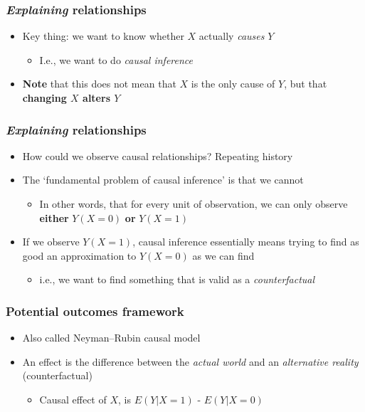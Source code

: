 \documentclass[aspectratio=43]{beamer}
\begin{document}
\begin{frame}
\frametitle{\textit{Explaining} relationships}
\centering

\begin{itemize}
  \item Key thing: we want to know whether $X$ actually \textit{causes} $Y$
  \begin{itemize}
    \item I.e., we want to do \textit{causal inference}
  \end{itemize}
  \item \textbf{Note} that this does not mean that $X$ is the only cause of $Y$, but that \textbf{changing $X$ alters $Y$}
\end{itemize}

\end{frame}

\begin{frame}
\frametitle{\textit{Explaining} relationships}
\centering

\begin{itemize}
  \item How could we observe causal relationships? Repeating history
  \item<2-> The `fundamental problem of causal inference' is that we cannot
  \begin{itemize}
    \item In other words, that for every unit of observation, we can only observe \textbf{either} $Y(X=0)$ \textbf{or} $Y(X=1)$
  \end{itemize}
  \item<3-> If we observe $Y(X=1)$, causal inference essentially means trying to find as good an approximation to $Y(X=0)$ as we can find
  \begin{itemize}
    \item i.e., we want to find something that is valid as a \textit{counterfactual}
  \end{itemize}
\end{itemize}

\end{frame}

\begin{frame}
\frametitle{Potential outcomes framework}
\centering

\begin{itemize}
  \item Also called Neyman–Rubin causal model
  \item An effect is the difference between the \textit{actual world} and an \textit{alternative reality} (counterfactual)
  \begin{itemize}
    \item Causal effect of $X$, is $E(Y|X = 1)$ - $E(Y|X = 0)$
  \end{itemize}
\end{itemize}

\end{frame}
\end{document}
